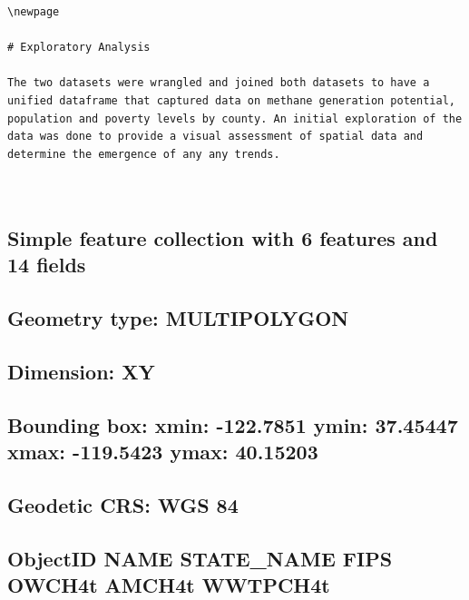 \documentclass[
  12pt,
]{article}
\begin{document}
\begin{verbatim}
\newpage

# Exploratory Analysis

The two datasets were wrangled and joined both datasets to have a
unified dataframe that captured data on methane generation potential,
population and poverty levels by county. An initial exploration of the
data was done to provide a visual assessment of spatial data and
determine the emergence of any any trends.



\end{verbatim}

\hypertarget{simple-feature-collection-with-6-features-and-14-fields}{%
\subsection{Simple feature collection with 6 features and 14
fields}\label{simple-feature-collection-with-6-features-and-14-fields}}

\hypertarget{geometry-type-multipolygon}{%
\subsection{Geometry type:
MULTIPOLYGON}\label{geometry-type-multipolygon}}

\hypertarget{dimension-xy}{%
\subsection{Dimension: XY}\label{dimension-xy}}

\hypertarget{bounding-box-xmin--122.7851-ymin-37.45447-xmax--119.5423-ymax-40.15203}{%
\subsection{Bounding box: xmin: -122.7851 ymin: 37.45447 xmax: -119.5423
ymax:
40.15203}\label{bounding-box-xmin--122.7851-ymin-37.45447-xmax--119.5423-ymax-40.15203}}

\hypertarget{geodetic-crs-wgs-84}{%
\subsection{Geodetic CRS: WGS 84}\label{geodetic-crs-wgs-84}}

\hypertarget{objectid-name-state_name-fips-owch4t-amch4t-wwtpch4t}{%
\subsection{ObjectID NAME STATE\_NAME FIPS OWCH4t AMCH4t
WWTPCH4t}\label{objectid-name-state_name-fips-owch4t-amch4t-wwtpch4t}}
\end{document}

